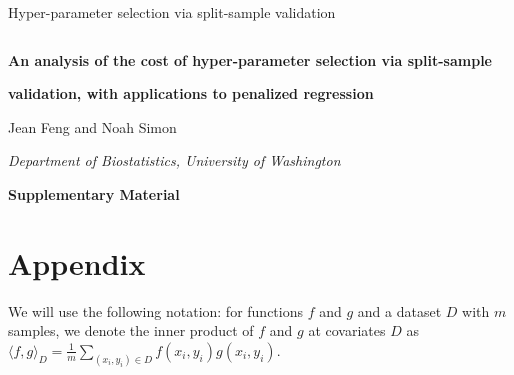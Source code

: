 \documentclass[10pt]{book}
\theoremstyle{definition}
\begin{document}

\renewcommand{\baselinestretch}{2}


{\hfill {\footnotesize\rm Hyper-parameter selection via split-sample validation} \hfill}

\renewcommand{\thefootnote}{}
$\ $\par \fontsize{12}{14pt plus.8pt minus .6pt}\selectfont


\centerline{\large\bf An analysis of the cost of hyper-parameter selection via split-sample}
\vspace{2pt}
\centerline{\large\bf validation, with applications to penalized regression}
\vspace{.25cm}
\centerline{Jean Feng and Noah Simon}
\vspace{.4cm}
\centerline{\it Department of Biostatistics, University of Washington}
\vspace{.55cm}
\centerline{\bf Supplementary Material}
\fontsize{9}{11.5pt plus.8pt minus .6pt}\selectfont
\noindent
\par

\setcounter{section}{0}
\setcounter{equation}{0}
\def\theequation{S\arabic{section}.\arabic{equation}}
\def\thesection{S\arabic{section}}

\fontsize{12}{14pt plus.8pt minus .6pt}\selectfont

\section{Appendix}\label{sec:proofs}

We will use the following notation: for functions $f$ and $g$ and a dataset $D$ with $m$ samples, we denote the inner product of $f$ and $g$ at covariates $D$ as $\langle f,g \rangle_{D} = \frac{1}{m} \sum_{(x_i, y_i) \in D} f(x_i, y_i) g(x_i, y_i) $.
\end{document}
